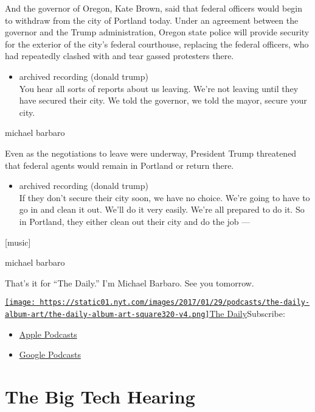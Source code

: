 And the governor of Oregon, Kate Brown, said that federal officers would
begin to withdraw from the city of Portland today. Under an agreement
between the governor and the Trump administration, Oregon state police
will provide security for the exterior of the city's federal courthouse,
replacing the federal officers, who had repeatedly clashed with and tear
gassed protesters there.

\begin{itemize}
\tightlist
\item
  archived recording (donald trump)\\
  You hear all sorts of reports about us leaving. We're not leaving
  until they have secured their city. We told the governor, we told the
  mayor, secure your city.
\end{itemize}

michael barbaro

Even as the negotiations to leave were underway, President Trump
threatened that federal agents would remain in Portland or return there.

\begin{itemize}
\tightlist
\item
  archived recording (donald trump)\\
  If they don't secure their city soon, we have no choice. We're going
  to have to go in and clean it out. We'll do it very easily. We're all
  prepared to do it. So in Portland, they either clean out their city
  and do the job ---
\end{itemize}

{[}music{]}

michael barbaro

That's it for ``The Daily.'' I'm Michael Barbaro. See you tomorrow.

\href{https://www.nytimes.com/column/the-daily}{\texttt{[image: https://static01.nyt.com/images/2017/01/29/podcasts/the-daily-album-art/the-daily-album-art-square320-v4.png]}The
Daily}Subscribe:

\begin{itemize}
\tightlist
\item
  \href{https://itunes.apple.com/us/podcast/id1200361736}{Apple
  Podcasts}
\item
  \href{https://www.google.com/podcasts?feed=aHR0cHM6Ly9yc3MuYXJ0MTkuY29tL3RoZS1kYWlseQ\%3D\%3D}{Google
  Podcasts}
\end{itemize}

\hypertarget{the-big-tech-hearing-1}{%
\section{The Big Tech Hearing}\label{the-big-tech-hearing-1}}


